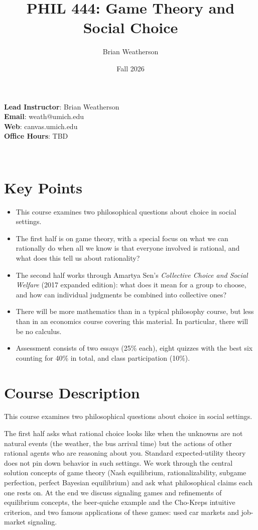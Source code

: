 \documentclass[
  letterpaper,
  DIV=11,
  numbers=noendperiod]{scrartcl}
\title{PHIL 444: Game Theory and Social Choice}
\author{Brian Weatherson}
\date{Fall 2026}
\providecommand{\tightlist}{%
  \setlength{\itemsep}{0pt}\setlength{\parskip}{0pt}}
\begin{document}
\maketitle


\textbf{Lead Instructor}: Brian Weatherson\\
\textbf{Email}: weath@umich.edu\\
\textbf{Web}: canvas.umich.edu\\
\textbf{Office Hours}: TBD

~

\section{Key Points}\label{key-points}

\begin{itemize}
\tightlist
\item
  This course examines two philosophical questions about choice in
  social settings.
\item
  The first half is on game theory, with a special focus on what we can
  rationally do when all we know is that everyone involved is rational,
  and what does this tell us about rationality?
\item
  The second half works through Amartya Sen's \emph{Collective Choice
  and Social Welfare} (2017 expanded edition): what does it mean for a
  group to choose, and how can individual judgments be combined into
  collective ones?
\item
  There will be more mathematics than in a typical philosophy course,
  but less than in an economics course covering this material. In
  particular, there will be no calculus.
\item
  Assessment consists of two essays (25\% each), eight quizzes with the
  best six counting for 40\% in total, and class participation (10\%).
\end{itemize}

\section{Course Description}\label{course-description}

This course examines two philosophical questions about choice in social
settings.

The first half asks what rational choice looks like when the unknowns
are not natural events (the weather, the bus arrival time) but the
actions of other rational agents who are reasoning about you. Standard
expected-utility theory does not pin down behavior in such settings. We
work through the central solution concepts of game theory (Nash
equilibrium, rationalizability, subgame perfection, perfect Bayesian
equilibrium) and ask what philosophical claims each one rests on. At the
end we discuss signaling games and refinements of equilibrium concepts,
the beer-quiche example and the Cho-Kreps intuitive criterion, and two
famous applications of these games: used car markets and job-market
signaling.
\end{document}
